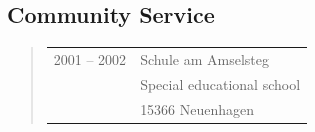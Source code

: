\subsection*{Community Service}
\begin{quote}
	\begin{tabular}{p{4cm}l}
	2001 -- 2002&Schule am Amselsteg\\
	&Special educational school\\
	&15366 Neuenhagen%
	\end{tabular}
\end{quote}